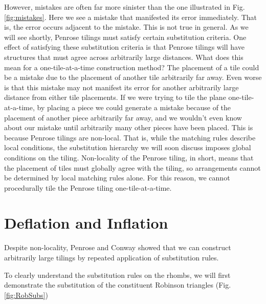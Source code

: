 \documentclass[
  oneside,
  11pt, a4paper,
  footinclude=true,
  headinclude=true,
  cleardoublepage=empty
]{scrbook}
\begin{document}
However, mistakes are often far more sinister than the one illustrated in Fig.\ref{fig:mistakes}. Here we see a mistake that manifested its error immediately. That is, the error occurs adjacent to the mistake. This is not true in general. As we will see shortly, Penrose tilings must satisfy certain substitution criteria. One effect of satisfying these substitution criteria is that Penrose tilings will have structures that must agree across arbitrarily large distances. What does this mean for a one-tile-at-a-time construction method? The placement of a tile could be a mistake due to the placement of another tile arbitrarily far away. Even worse is that this mistake may not manifest its error for another arbitrarily large distance from either tile placements. If we were trying to tile the plane one-tile-at-a-time, by placing a piece we could generate a mistake because of the placement of another piece arbitrarily far away, and we wouldn't even know about our mistake until arbitrarily many other pieces have been placed. This is because Penrose tilings are non-local. That is, while the matching rules describe local conditions, the substitution hierarchy we will soon discuss imposes global conditions on the tiling. Non-locality of the Penrose tiling, in short, means that the placement of tiles must globally agree with the tiling, so arrangements cannot be determined by local matching rules alone. For this reason, we cannot procedurally tile the Penrose tiling one-tile-at-a-time.


\section{Deflation and Inflation} %
Despite non-locality, Penrose and Conway showed that we can construct arbitrarily large tilings by repeated application of substitution rules.

To clearly understand the substitution rules on the rhombs, we will first demonstrate the substitution of the constituent Robinson triangles (Fig.\ref{fig:RobSubs})
\end{document}
